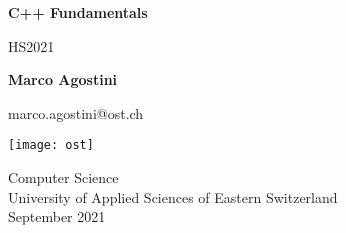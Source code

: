 \begin{titlepage}
    \begin{center}
        \vspace*{1cm}
            
        \Huge
        \textbf{C++ Fundamentals}
            
        \vspace{0.5cm}
        \LARGE
        HS2021
            
        \vspace{1.5cm}
            
        \textbf{Marco Agostini} 
        \vspace{0.5cm}
        
        \small{marco.agostini@ost.ch}
            
        \vfill
            
            
        
            
        \texttt{[image: ost]}
           
        \vspace{2cm}
           
        \Large
        Computer Science\\
        University of Applied Sciences of Eastern Switzerland\\
        September 2021
        

    \end{center}
\end{titlepage}

\tableofcontents
